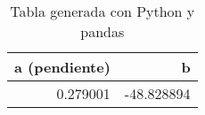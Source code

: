 \begin{table}
\caption{Tabla generada con Python y pandas}
\label{tab:datos}
\begin{tabular}{rr}
\toprule
a (pendiente) & b \\
\midrule
0.279001 & -48.828894 \\
\bottomrule
\end{tabular}
\end{table}
